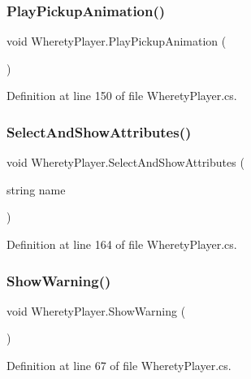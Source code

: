 \subsubsection{\texorpdfstring{PlayPickupAnimation()}{PlayPickupAnimation()}}
{\footnotesize\ttfamily void Wherety\+Player.\+Play\+Pickup\+Animation (\begin{DoxyParamCaption}{ }\end{DoxyParamCaption})}



Definition at line 150 of file Wherety\+Player.\+cs.

\mbox{\label{class_wherety_player_a9d18e586a183cf3fcf768c863ca7575d}} 
\subsubsection{\texorpdfstring{SelectAndShowAttributes()}{SelectAndShowAttributes()}}
{\footnotesize\ttfamily void Wherety\+Player.\+Select\+And\+Show\+Attributes (\begin{DoxyParamCaption}\item[{string}]{name }\end{DoxyParamCaption})}



Definition at line 164 of file Wherety\+Player.\+cs.

\mbox{\label{class_wherety_player_a028e387db9360e7ba6b8530d1af5c6cf}} 
\subsubsection{\texorpdfstring{ShowWarning()}{ShowWarning()}}
{\footnotesize\ttfamily void Wherety\+Player.\+Show\+Warning (\begin{DoxyParamCaption}{ }\end{DoxyParamCaption})}



Definition at line 67 of file Wherety\+Player.\+cs.

\mbox{\label{class_wherety_player_a31c5250223298c32c6909fb84772fad8}} 
